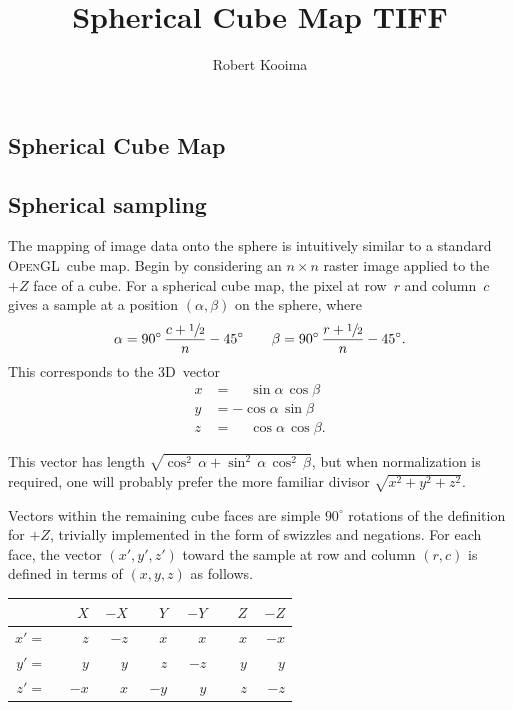 \documentclass[oneside,11pt]{memoir}
\newcommand{\threed}  {3D}
\newcommand{\opengl}  {\textsc{OpenGL}}
\newcommand{\B}{\bigstrut[b]}
\newcommand{\T}{\bigstrut[t]}
\newcommand{\Pos}[1]{\phantom{-}{#1}}
\newcommand{\Neg}[1]{        {-}{#1}}
\begin{document}
\title{Spherical Cube Map TIFF}
\author{Robert Kooima}
\maketitle
\begin{Spacing}{1.1}





\chapter{Spherical Cube Map}

\section{Spherical sampling}

The mapping of image data onto the sphere is intuitively similar to a standard \opengl\ cube map. Begin by considering an $n\times n$ raster image applied to the $+Z$ face of a cube. For a spherical cube map, the pixel at row~$r$ and column~$c$ gives a sample at a position $(\alpha, \beta)$ on the sphere, where
\[\alpha=90^{\circ}\,\frac{c + \sfrac{1}{2}}{n} - 45^{\circ}\qquad\beta=90^{\circ}\,\frac{r + \sfrac{1}{2}}{n} - 45^{\circ}.\]
This corresponds to the \threed\ vector
\begin{align*}
x& = \phantom{-}\sin\alpha\, \cos\beta\\
y& =         {-}\cos\alpha\, \sin\beta\\
z& = \phantom{-}\cos\alpha\, \cos\beta.
\end{align*}

This vector has length \(\sqrt{\cos^2\,\alpha + \sin^2\,\alpha\,\cos^2\,\beta}\), but when normalization is required, one will probably prefer the more familiar divisor \(\sqrt{x^2+y^2+z^2}\).

Vectors within the remaining cube faces are simple $90^\circ$ rotations of the definition for $+Z$, trivially implemented in the form of swizzles and negations. For each face, the vector $(x', y', z')$ toward the sample at row and column $(r, c)$ is defined in terms of $(x, y, z)$ as follows.
\begin{center}
\begin{tabular}{rr|r|r|r|r|r}
    &$\Pos{X}$&$\Neg{X}$&$\Pos{Y}$&$\Neg{Y}$&$\Pos{Z}$&$\Neg{Z}$\B\\\hline
$x'=$&$\Pos{z}$&$\Neg{z}$&$\Pos{x}$&$\Pos{x}$&$\Pos{x}$&$\Neg{x}$\T\\
$y'=$&$\Pos{y}$&$\Pos{y}$&$\Pos{z}$&$\Neg{z}$&$\Pos{y}$&$\Pos{y}$\\
$z'=$&$\Neg{x}$&$\Pos{x}$&$\Neg{y}$&$\Pos{y}$&$\Pos{z}$&$\Neg{z}$\\
\end{tabular}
\end{center}


\end{Spacing}
\end{document}
